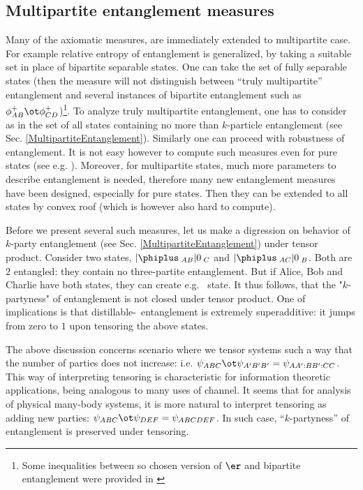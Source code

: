 \documentclass[twocolumn,aps,rmp]{revtex4}
\begin{document}
\subsection{Multipartite entanglement measures}
\label{subsec:multipartite}
Many of the axiomatic measures, are immediately extended to multipartite case.
For example relative entropy of entanglement is generalized, by taking a suitable
set in place of bipartite separable states. One can take the set of fully separable states
(then the measure will not distinguish between ``truly multipartite''
entanglement and several instances of bipartite entanglement such as $\phi^+_{AB}\ot \phi^+_{CD}$)\footnote{Some inequalities between so chosen version of $\er$
and bipartite entanglement were provided in \cite{PlenioV2001-rel-multi}}.
To analyze truly multipartite entanglement, one has to consider as
in \cite{VPRK1997} the set of all states containing no more than
$k$-particle entanglement (see Sec. \ref{MultipartiteEntanglement}). Similarly
one can proceed with robustness of entanglement. It is not easy
however to compute such measures even for pure states (see e.g.
\cite{PlenioV2001-rel-multi}). Moreover, for multipartite states,
much more parameters to describe entanglement is needed, therefore
many new entanglement measures have been designed, especially for
pure states. Then they can be extended to all states by convex roof
(which is however also hard to compute).

Before we present several such measures, let us make a digression on
behavior of  $k$-party entanglement (see Sec.
\ref{MultipartiteEntanglement}) under tensor product. Consider two
states, $|\phiplus\>_{AB}|0\>_C$ and $|\phiplus\>_{AC}|0\>_B$. Both are $2$
entangled: they contain no three-partite entanglement. But if Alice,
Bob and Charlie have both states,  they can create e.g. \ghz\ state.
It thus follows, that the "$k$-partyness" of entanglement is not closed under tensor
product. One of  implications is that distillable-\ghz\ entanglement
is extremely  superadditive: it jumps from zero to $1$ upon
tensoring the above states.



The above discussion concerns scenario where we tensor systems
such a way that the
number of parties does not increase: i.e. $\psi_{ABC}\ot \psi_{A'B'B'}=\psi_{AA':BB':CC}$.
This way of interpreting tensoring is characteristic for information theoretic
applications, being analogous to many uses of channel. It seems that
for analysis of physical many-body systems, it is more natural
to interpret tensoring as adding new parties: $\psi_{ABC}\ot \psi_{DEF}=\psi_{ABCDEF}$.
In such case, ``$k$-partyness'' of entanglement is preserved under tensoring.
\end{document}
